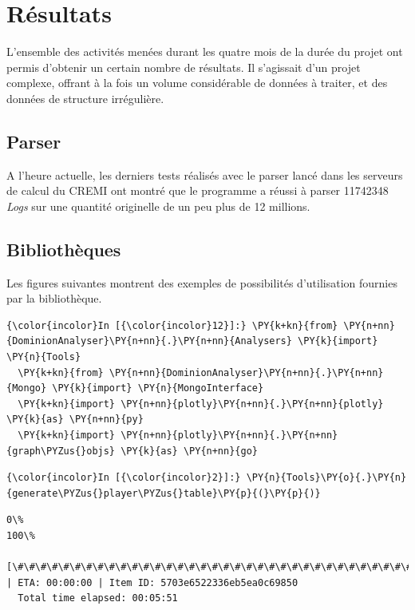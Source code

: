\chapter{Résultats}

L'ensemble des activités menées durant les quatre mois de la durée du projet ont permis d'obtenir un certain nombre de résultats. Il s'agissait d'un projet complexe, offrant à la fois un volume considérable de données à traiter, et des données de structure irrégulière. 

\section{Parser}
A l'heure actuelle, les derniers tests réalisés avec le parser lancé dans les serveurs de calcul du CREMI ont montré que le programme a réussi à parser 11742348 \textit{Logs} sur une quantité originelle de un peu plus de 12 millions. 


\section{Bibliothèques}
Les figures suivantes montrent des exemples de possibilités d'utilisation fournies par la bibliothèque.  


\begin{Verbatim}[commandchars=\\\{\}]
  {\color{incolor}In [{\color{incolor}12}]:} \PY{k+kn}{from} \PY{n+nn}{DominionAnalyser}\PY{n+nn}{.}\PY{n+nn}{Analysers} \PY{k}{import} \PY{n}{Tools}
  \PY{k+kn}{from} \PY{n+nn}{DominionAnalyser}\PY{n+nn}{.}\PY{n+nn}{Mongo} \PY{k}{import} \PY{n}{MongoInterface}
  \PY{k+kn}{import} \PY{n+nn}{plotly}\PY{n+nn}{.}\PY{n+nn}{plotly} \PY{k}{as} \PY{n+nn}{py}
  \PY{k+kn}{import} \PY{n+nn}{plotly}\PY{n+nn}{.}\PY{n+nn}{graph\PYZus{}objs} \PY{k}{as} \PY{n+nn}{go}
\end{Verbatim}

\begin{Verbatim}[commandchars=\\\{\}]
  {\color{incolor}In [{\color{incolor}2}]:} \PY{n}{Tools}\PY{o}{.}\PY{n}{generate\PYZus{}player\PYZus{}table}\PY{p}{(}\PY{p}{)}
\end{Verbatim}

\begin{Verbatim}[commandchars=\\\{\}]
  0\%                                                                  100\%
  [\#\#\#\#\#\#\#\#\#\#\#\#\#\#\#\#\#\#\#\#\#\#\#\#\#\#\#\#\#\#\#\#\#\#\#\#\#\#\#\#\#\#\#\#\#\#\#\#\#\#\#\#\#\#\#\#\#\#\#\#\#\#\#\#\#\#\#\#\#\#] | ETA: 00:00:00 | Item ID: 5703e6522336eb5ea0c69850
  Total time elapsed: 00:05:51
\end{Verbatim}

